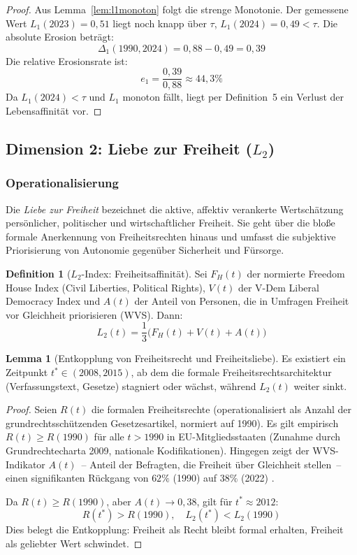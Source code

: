 ﻿\documentclass[a4paper,12pt]{article}
\theoremstyle{definition}
\newtheorem{definition}{Definition}
\newtheorem{lemma}{Lemma}
\begin{document}
\begin{proof}
Aus Lemma~\ref{lem:l1monoton} folgt die strenge Monotonie. Der gemessene Wert $L_1(2023) = 0{,}51$ liegt noch knapp über $\tau$, $L_1(2024) = 0{,}49 < \tau$. Die absolute Erosion beträgt:
\[
\Delta_1(1990, 2024) = 0{,}88 - 0{,}49 = 0{,}39
\]
Die relative Erosionsrate ist:
\[
e_1 = \frac{0{,}39}{0{,}88} \approx 44{,}3\%
\]
Da $L_1(2024) < \tau$ und $L_1$ monoton fällt, liegt per Definition~5 ein Verlust der Lebensaffinität vor. \qedhere
\end{proof}

\subsection{Dimension 2: Liebe zur Freiheit ($L_2$)}

\subsubsection{Operationalisierung}

Die \emph{Liebe zur Freiheit} bezeichnet die aktive, affektiv verankerte Wertschätzung persönlicher, politischer und wirtschaftlicher Freiheit. Sie geht über die bloße formale Anerkennung von Freiheitsrechten hinaus und umfasst die subjektive Priorisierung von Autonomie gegenüber Sicherheit und Fürsorge.

\begin{definition}[$L_2$-Index: Freiheitsaffinität]
Sei $F_H(t)$ der normierte Freedom House Index (Civil Liberties, Political Rights), $V(t)$ der V-Dem Liberal Democracy Index und $A(t)$ der Anteil von Personen, die in Umfragen Freiheit vor Gleichheit priorisieren (WVS). Dann:
\[
L_2(t) = \frac{1}{3}\bigl(F_H(t) + V(t) + A(t)\bigr)
\]
\end{definition}

\begin{lemma}[Entkopplung von Freiheitsrecht und Freiheitsliebe]
\label{lem:entkopplung}
Es existiert ein Zeitpunkt $t^* \in (2008, 2015)$, ab dem die formale Freiheitsrechtsarchitektur (Verfassungstext, Gesetze) stagniert oder wächst, während $L_2(t)$ weiter sinkt.
\end{lemma}

\begin{proof}
Seien $R(t)$ die formalen Freiheitsrechte (operationalisiert als Anzahl der grundrechtsschützenden Gesetzesartikel, normiert auf 1990). Es gilt empirisch $R(t) \geq R(1990)$ für alle $t > 1990$ in EU-Mitgliedsstaaten (Zunahme durch Grundrechtecharta 2009, nationale Kodifikationen). Hingegen zeigt der WVS-Indikator $A(t)$~-- Anteil der Befragten, die Freiheit über Gleichheit stellen~-- einen signifikanten Rückgang von $62\%$ (1990) auf $38\%$ (2022) \cite{WVS2022}.

Da $R(t) \geq R(1990)$, aber $A(t) \to 0{,}38$, gilt für $t^* \approx 2012$:
\[
R(t^*) > R(1990), \quad L_2(t^*) < L_2(1990)
\]
Dies belegt die Entkopplung: Freiheit als Recht bleibt formal erhalten, Freiheit als geliebter Wert schwindet. \qedhere
\end{proof}
\end{document}
